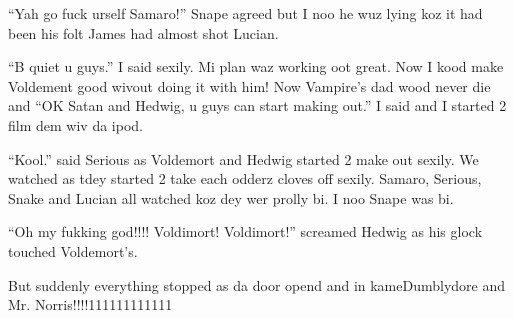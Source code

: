 \enquote{Yah go fuck urself Samaro!} Snape agreed but I noo he wuz lying koz it had been his folt James had almost shot Lucian.

\enquote{B quiet u guys.} I said sexily. Mi plan waz working oot great. Now I kood make Voldement good wivout doing it with him! Now Vampire's dad wood never die and \enquote{OK Satan and Hedwig, u guys can start making out.} I said and I started 2 film dem wiv da ipod.

\enquote{Kool.} said Serious as Voldemort and Hedwig started 2 make out sexily. We watched as tdey started 2 take each odderz cloves off sexily. Samaro, Serious, Snake and Lucian all watched koz dey wer prolly bi. I noo Snape was bi.

\enquote{Oh my fukking god!!!! Voldimort! Voldimort!} screamed Hedwig as his glock touched Voldemort's.

But suddenly everything stopped as da door opend and in kame\newline\phantom{}\dotfill Dumblydore and Mr. Norris!!!!111111111111

